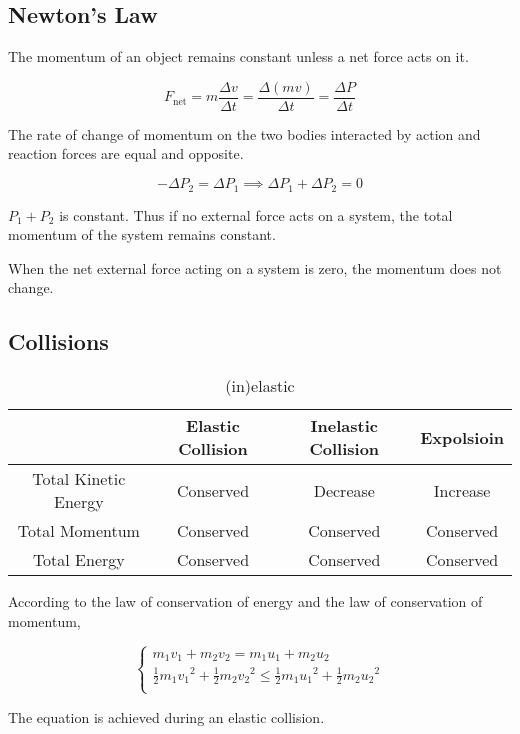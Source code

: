 \documentclass[11pt, a4paper,oneside]{book}
\begin{document}
\subsection{Newton's Law}
\begin{definition}
    The momentum of an object remains constant unless a net force acts on it.	
\end{definition}
\begin{definition}
    \[
        F_{\text{net}} = m \frac{\Delta v}{\Delta t} = \frac{\Delta (mv)}{\Delta t} = \frac{\Delta P}{\Delta t}
    \]	
\end{definition}
\begin{theorem}
    The rate of change of momentum on the two bodies interacted by action and reaction forces are equal and opposite.
\end{theorem}
\[
    -\Delta P_2 = \Delta P_1 \implies \Delta P_1 + \Delta P_2 = 0
\]\par
$ P_1 + P_2 $ is constant. Thus if no external force acts on a system, the total momentum of the system remains constant.
\begin{theorem}
    When the net external force acting on a system is zero, the momentum does not change.	
\end{theorem}
\subsection{Collisions}
\begin{table}[!ht]
    \centering
    \begin{tabular}{|c|c|c|c|}
    \hline
        ~ & Elastic Collision & Inelastic Collision & Expolsioin\\ \hline
        Total Kinetic Energy & Conserved & Decrease & Increase \\ \hline
        Total Momentum & Conserved & Conserved & Conserved \\ \hline
        Total Energy & Conserved & Conserved & Conserved \\ \hline
    \end{tabular}
    \caption{(in)elastic}
\end{table}
According to the law of conservation of energy and the law of conservation of momentum, \par
\[
    \left\{\begin{matrix} 
        m_1v_1 + m_2v_2 = m_1u_1 + m_2u_2 \\ 
        \frac{1}{2}m_1{v_1}^2 + \frac{1}{2}m_2{v_2}^2 \leq \frac{1}{2} m_1{u_1}^2 + \frac{1}{2}m_2{u_2}^2\\
        \end{matrix}\right. 
\]\par
The equation is achieved during an elastic collision.
\end{document}
